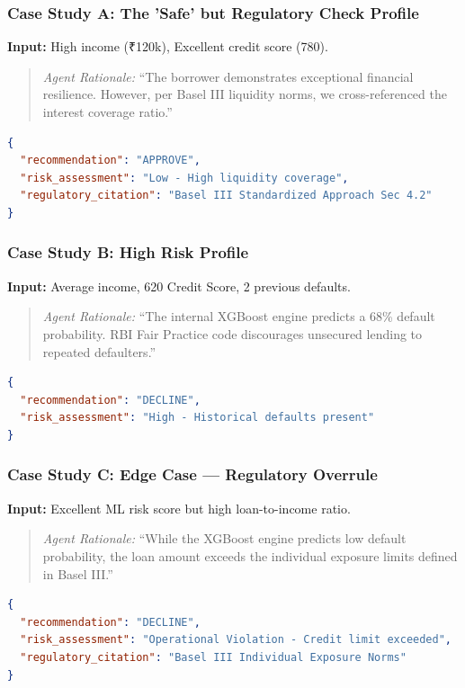 \documentclass[12pt, a4paper]{article}
\begin{document}
\subsubsection{Case Study A: The 'Safe' but Regulatory Check Profile}
\textbf{Input:} High income (₹120k), Excellent credit score (780).
\begin{quote}
\textit{Agent Rationale:} ``The borrower demonstrates exceptional financial resilience. However, per Basel III liquidity norms, we cross-referenced the interest coverage ratio.''
\end{quote}
\begin{lstlisting}[language=json]
{
  "recommendation": "APPROVE",
  "risk_assessment": "Low - High liquidity coverage",
  "regulatory_citation": "Basel III Standardized Approach Sec 4.2"
}
\end{lstlisting}

\subsubsection{Case Study B: High Risk Profile}
\textbf{Input:} Average income, 620 Credit Score, 2 previous defaults.
\begin{quote}
\textit{Agent Rationale:} ``The internal XGBoost engine predicts a 68\% default probability. RBI Fair Practice code discourages unsecured lending to repeated defaulters.''
\end{quote}
\begin{lstlisting}[language=json]
{
  "recommendation": "DECLINE",
  "risk_assessment": "High - Historical defaults present"
}
\end{lstlisting}

\subsubsection{Case Study C: Edge Case --- Regulatory Overrule}
\textbf{Input:} Excellent ML risk score but high loan-to-income ratio.
\begin{quote}
\textit{Agent Rationale:} ``While the XGBoost engine predicts low default probability, the loan amount exceeds the individual exposure limits defined in Basel III.''
\end{quote}
\begin{lstlisting}[language=json]
{
  "recommendation": "DECLINE",
  "risk_assessment": "Operational Violation - Credit limit exceeded",
  "regulatory_citation": "Basel III Individual Exposure Norms"
}
\end{lstlisting}
\end{document}
